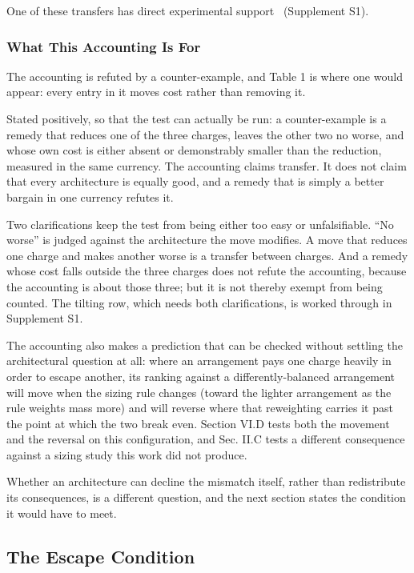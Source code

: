 \documentclass[journal]{new-aiaa}
\begin{document}
One of these transfers has direct experimental support~\cite{r14} (Supplement S1).

\subsubsection{What This Accounting Is For}

The accounting is refuted by a counter-example, and Table 1 is where one would appear: every entry in it moves cost rather than removing it.

Stated positively, so that the test can actually be run: a counter-example is a remedy that reduces one of the three charges, leaves the other two no worse, and whose own cost is either absent or demonstrably smaller than the reduction, measured in the same currency. The accounting claims transfer. It does not claim that every architecture is equally good, and a remedy that is simply a better bargain in one currency refutes it.

Two clarifications keep the test from being either too easy or unfalsifiable. ``No worse'' is judged against the architecture the move modifies. A move that reduces one charge and makes another worse is a transfer between charges. And a remedy whose cost falls outside the three charges does not refute the accounting, because the accounting is about those three; but it is not thereby exempt from being counted. The tilting row, which needs both clarifications, is worked through in Supplement S1.

The accounting also makes a prediction that can be checked without settling the architectural question at all: where an arrangement pays one charge heavily in order to escape another, its ranking against a differently-balanced arrangement will move when the sizing rule changes (toward the lighter arrangement as the rule weights mass more) and will reverse where that reweighting carries it past the point at which the two break even. Section VI.D tests both the movement and the reversal on this configuration, and Sec. II.C tests a different consequence against a sizing study this work did not produce.

Whether an architecture can decline the mismatch itself, rather than redistribute its consequences, is a different question, and the next section states the condition it would have to meet.

\subsection{The Escape Condition}
\end{document}
